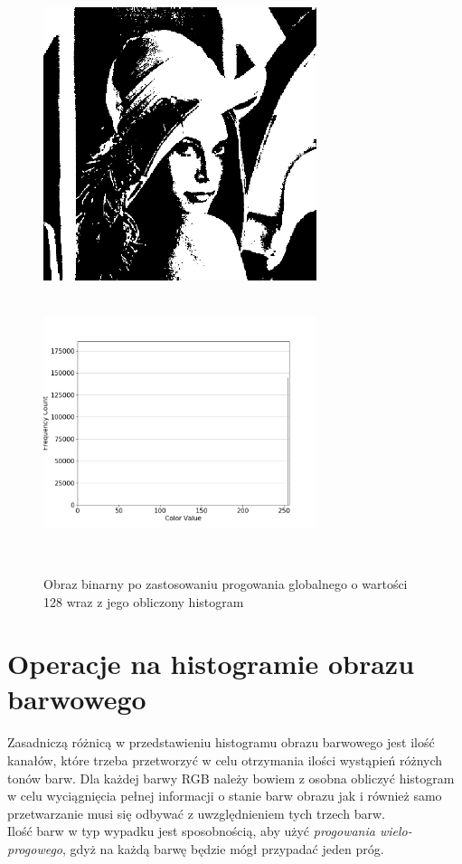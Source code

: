\documentclass[a4paper,12pt]{book}
\begin{document}
\begin{figure}[H]
	\caption{Obraz binarny po zastosowaniu progowania globalnego o wartości 128 wraz z jego obliczony histogram}
	\includegraphics[width=8cm, height=8cm]{5-5/global-threshold-image-lena-128.png}
	\includegraphics[width=8cm, height=8cm]{5-5/global-threshold-lena-128.png}
\end{figure}

\chapter{Operacje na histogramie obrazu barwowego}
Zasadniczą różnicą w przedstawieniu histogramu obrazu barwowego jest ilość kanałów, które trzeba przetworzyć w celu otrzymania ilości wystąpień różnych tonów barw. Dla każdej barwy RGB należy bowiem z osobna obliczyć histogram w celu wyciągnięcia pełnej informacji o stanie barw obrazu jak i również samo przetwarzanie musi się odbywać z uwzględnieniem tych trzech barw. \\
Ilość barw w typ wypadku jest sposobnością, aby użyć \textit{progowania wielo-progowego}, gdyż na każdą barwę będzie mógł przypadać jeden próg. 
\end{document}
